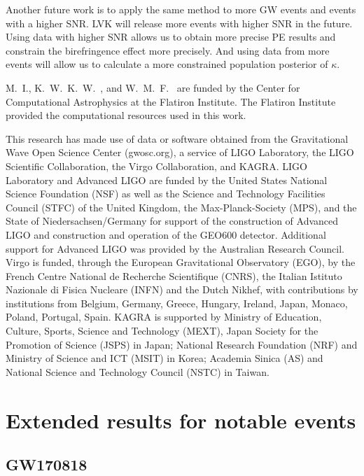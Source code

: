 \documentclass[aps,prd,twocolumn,superscriptaddress,preprintnumbers,floatfix,nofootinbib]{revtex4-2}
\begin{document}
Another future work is to apply the same method to more \ac{GW} events and events with a higher \ac{SNR}.
\ac{LVK} will release more events with higher \ac{SNR} in the future.
Using data with higher \ac{SNR} allows us to obtain more precise \ac{PE} results and constrain the birefringence effect more precisely.
And using data from more events will allow us to calculate a more constrained population posterior of $\kappa$.

\begin{acknowledgments}
M.~I., K.~W.~K.~W.~, and W.~M.~F.~ are funded by the Center for Computational Astrophysics at the Flatiron Institute.
The Flatiron Institute provided the computational resources used in this work.

This research has made use of data or software obtained from the Gravitational Wave Open Science Center (gwosc.org), a service of LIGO Laboratory, the LIGO Scientific Collaboration, the Virgo Collaboration, and KAGRA.
LIGO Laboratory and Advanced LIGO are funded by the United States National Science Foundation (NSF) as well as the Science and Technology Facilities Council (STFC) of the United Kingdom, the Max-Planck-Society (MPS), and the State of Niedersachsen/Germany for support of the construction of Advanced LIGO and construction and operation of the GEO600 detector.
Additional support for Advanced LIGO was provided by the Australian Research Council.
Virgo is funded, through the European Gravitational Observatory (EGO), by the French Centre National de Recherche Scientifique (CNRS), the Italian Istituto Nazionale di Fisica Nucleare (INFN) and the Dutch Nikhef, with contributions by institutions from Belgium, Germany, Greece, Hungary, Ireland, Japan, Monaco, Poland, Portugal, Spain.
KAGRA is supported by Ministry of Education, Culture, Sports, Science and Technology (MEXT), Japan Society for the Promotion of Science (JSPS) in Japan; National Research Foundation (NRF) and Ministry of Science and ICT (MSIT) in Korea; Academia Sinica (AS) and National Science and Technology Council (NSTC) in Taiwan.
\end{acknowledgments}

\appendix

\section{Extended results for notable events}

\subsection{GW170818}
\label{sec:corner_GW170818_appendix}
\end{document}
